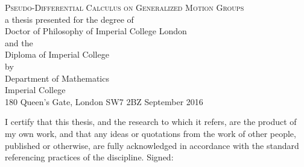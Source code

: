 \begin{titlepage}
\begin{center}
\null\vfill
{\LARGE{\textsc{Pseudo-Differential Calculus on Generalized Motion Groups}}}
\\
\vfill
{\sc \footnotesize
{\sc a thesis presented for the degree of}\\
Doctor of Philosophy of Imperial College London\\
{\sc and the}\\
Diploma of Imperial College\\
{\sc by} \\
}
{\large{}}
\vfill\vfill\vfill
{\sc \footnotesize{
Department of Mathematics\\
Imperial College \\
180 Queen's Gate, London SW7 2BZ}
\vfill
{{September 2016}}
}
\end{center}
\end{titlepage}

\newpage
\hphantom{1}
\vfill
\noindent I certify that this thesis, and the research to which it refers,
are the product of my own work, and that any ideas or quotations from the
work of other people, published or otherwise, are fully acknowledged in accordance
with the standard referencing practices of the discipline.
\vfill
{\hfill Signed: \hrulefill}
\vfill
\singlespacing
